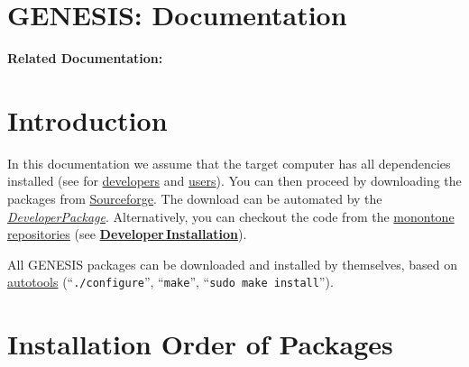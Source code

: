 \documentclass[12pt]{article}
\begin{document}
\section*{GENESIS: Documentation}

{\bf Related Documentation:}

\section*{Introduction}

In this documentation we assume that the target computer has all
dependencies installed (see for
\href{../installation-developer/installation-developer.tex}{developers}
and \href{../installation-debian/installation-debian.tex}{users}). You can
then proceed by downloading the packages from
\href{http://sourceforge.net/project/showfiles.php?group_id=162899}{Sourceforge}.
The download can be automated by the
\href{../developer-package/developer-package.tex}{\it DeveloperPackage}. Alternatively, you can checkout the code from the
\href{http://monotone.ca/}{monontone}
\href{../developer-intro/developer-intro.tex}{repositories} (see \href{../installation-developer/installation-developer.tex}{\bf Developer\,Installation}).

All GENESIS packages can be downloaded and installed by themselves,
based on \href{http://www.gnu.org/software/autoconf/}{autotools}
(``{\tt ./configure}'', ``{\tt make}'', ``{\tt sudo make install}'').



\section*{Installation Order of Packages}
\end{document}
